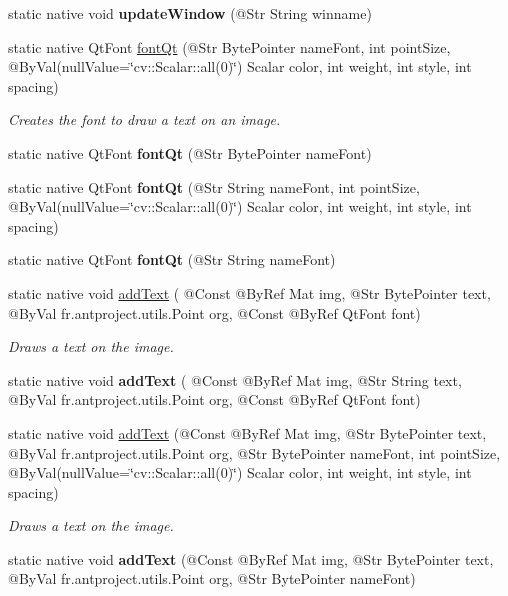 \begin{DoxyCompactItemize}
static native void {\bfseries update\+Window} (@Str String winname)
\item 
static native Qt\+Font \hyperlink{group__highgui__qt_gaee437fe91204f6d6d9016c6a7b78850d}{font\+Qt} (@Str Byte\+Pointer name\+Font, int point\+Size, @By\+Val(null\+Value=\char`\"{}cv\+::\+Scalar\+::all(0)\char`\"{}) Scalar color, int weight, int style, int spacing)
\begin{DoxyCompactList}\small\item\em Creates the font to draw a text on an image. \end{DoxyCompactList}\item 
static native Qt\+Font {\bfseries font\+Qt} (@Str Byte\+Pointer name\+Font)
\item 
static native Qt\+Font {\bfseries font\+Qt} (@Str String name\+Font, int point\+Size, @By\+Val(null\+Value=\char`\"{}cv\+::\+Scalar\+::all(0)\char`\"{}) Scalar color, int weight, int style, int spacing)
\item 
static native Qt\+Font {\bfseries font\+Qt} (@Str String name\+Font)
\item 
static native void \hyperlink{group__highgui__qt_gaccc5f5d89abe18bc7adfd650dccb265f}{add\+Text} ( @Const @By\+Ref Mat img, @Str Byte\+Pointer text, @By\+Val fr.antproject.utils.Point org, @Const @By\+Ref Qt\+Font font)
\begin{DoxyCompactList}\small\item\em Draws a text on the image. \end{DoxyCompactList}\item 
static native void {\bfseries add\+Text} ( @Const @By\+Ref Mat img, @Str String text, @By\+Val fr.antproject.utils.Point org, @Const @By\+Ref Qt\+Font font)
\item 
static native void \hyperlink{group__highgui__qt_ga7595781df35faa10eff729ed3e41b5fd}{add\+Text} (@Const @By\+Ref Mat img, @Str Byte\+Pointer text, @By\+Val fr.antproject.utils.Point org, @Str Byte\+Pointer name\+Font, int point\+Size, @By\+Val(null\+Value=\char`\"{}cv\+::\+Scalar\+::all(0)\char`\"{}) Scalar color, int weight, int style, int spacing)
\begin{DoxyCompactList}\small\item\em Draws a text on the image. \end{DoxyCompactList}\item 
static native void {\bfseries add\+Text} (@Const @By\+Ref Mat img, @Str Byte\+Pointer text, @By\+Val fr.antproject.utils.Point org, @Str Byte\+Pointer name\+Font)
\item 

\end{DoxyCompactItemize}
